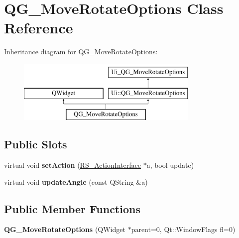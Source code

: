 \hypertarget{classQG__MoveRotateOptions}{\section{Q\-G\-\_\-\-Move\-Rotate\-Options Class Reference}
\label{classQG__MoveRotateOptions}
}
Inheritance diagram for Q\-G\-\_\-\-Move\-Rotate\-Options\-:\begin{figure}[H]
\begin{center}
\leavevmode
\includegraphics[height=3.000000cm]{classQG__MoveRotateOptions}
\end{center}
\end{figure}
\subsection*{Public Slots}
\begin{DoxyCompactItemize}
\item 
\hypertarget{classQG__MoveRotateOptions_a4111da0663e3a5c588c8a8d5d2f5b164}{virtual void {\bfseries set\-Action} (\hyperlink{classRS__ActionInterface}{R\-S\-\_\-\-Action\-Interface} $\ast$a, bool update)}\label{classQG__MoveRotateOptions_a4111da0663e3a5c588c8a8d5d2f5b164}

\item 
\hypertarget{classQG__MoveRotateOptions_a06e3b2ef74b2108422466a037278387b}{virtual void {\bfseries update\-Angle} (const Q\-String \&a)}\label{classQG__MoveRotateOptions_a06e3b2ef74b2108422466a037278387b}

\end{DoxyCompactItemize}
\subsection*{Public Member Functions}
\begin{DoxyCompactItemize}
\item 
\hypertarget{classQG__MoveRotateOptions_a0fd1f043b2a49e55a52dd88d58adee8b}{{\bfseries Q\-G\-\_\-\-Move\-Rotate\-Options} (Q\-Widget $\ast$parent=0, Qt\-::\-Window\-Flags fl=0)}\label{classQG__MoveRotateOptions_a0fd1f043b2a49e55a52dd88d58adee8b}

\end{DoxyCompactItemize}
